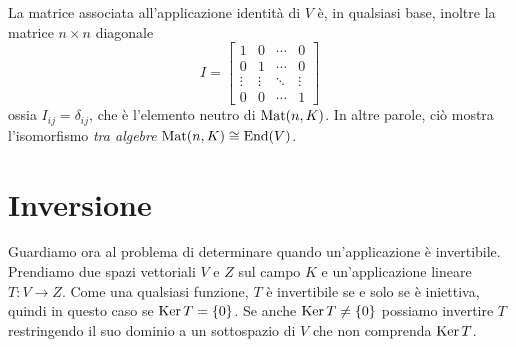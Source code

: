 La matrice associata all'applicazione identità di $V$ è, in qualsiasi base, inoltre la matrice $n\times n$ diagonale
\begin{equation}
	I=
	\begin{bmatrix}
		1&0&\cdots&0\\
		0&1&\cdots&0\\
		\vdots&\vdots&\ddots&\vdots\\
		0&0&\cdots&1
	\end{bmatrix}
\end{equation}
ossia $I_{ij}=\delta_{ij}$, che è l'elemento neutro di $\operatorname{Mat}(n,K)$.
In altre parole, ciò mostra l'isomorfismo \emph{tra algebre} $\operatorname{Mat}(n,K)\cong\operatorname{End}(V)$.

\section{Inversione}
Guardiamo ora al problema di determinare quando un'applicazione è invertibile.
Prendiamo due spazi vettoriali $V$ e $Z$ sul campo $K$ e un'applicazione lineare $T\colon V\to Z$.
Come una qualsiasi funzione, $T$ è invertibile se e solo se è iniettiva, quindi in questo caso se $\operatorname{Ker} T=\{0\}$.
Se anche $\operatorname{Ker} T\ne\{0\}$ possiamo invertire $T$ restringendo il suo dominio a un sottospazio di $V$ che non comprenda $\operatorname{Ker} T$.

